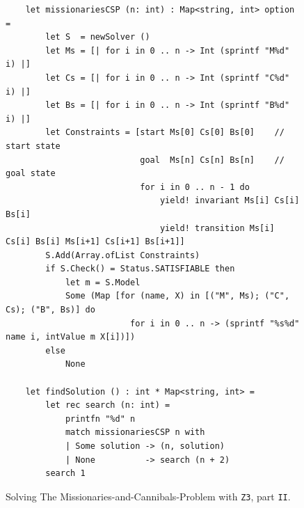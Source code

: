 \begin{figure}[!ht]
\centering
\begin{verbatim}
    let missionariesCSP (n: int) : Map<string, int> option =
        let S  = newSolver ()
        let Ms = [| for i in 0 .. n -> Int (sprintf "M%d" i) |]
        let Cs = [| for i in 0 .. n -> Int (sprintf "C%d" i) |]
        let Bs = [| for i in 0 .. n -> Int (sprintf "B%d" i) |]
        let Constraints = [start Ms[0] Cs[0] Bs[0]    // start state
                           goal  Ms[n] Cs[n] Bs[n]    // goal state
                           for i in 0 .. n - 1 do
                               yield! invariant Ms[i] Cs[i] Bs[i]
                               yield! transition Ms[i] Cs[i] Bs[i] Ms[i+1] Cs[i+1] Bs[i+1]]
        S.Add(Array.ofList Constraints)
        if S.Check() = Status.SATISFIABLE then
            let m = S.Model
            Some (Map [for (name, X) in [("M", Ms); ("C", Cs); ("B", Bs)] do
                         for i in 0 .. n -> (sprintf "%s%d" name i, intValue m X[i])])
        else
            None

    let findSolution () : int * Map<string, int> =
        let rec search (n: int) =
            printfn "%d" n
            match missionariesCSP n with
            | Some solution -> (n, solution)
            | None          -> search (n + 2)
        search 1
\end{verbatim}
\vspace*{-0.3cm}
\caption{Solving The Missionaries-and-Cannibals-Problem with \texttt{Z3}, part \texttt{II}.}
\label{fig:Missionaries-Z3.ipynb-2}
\end{figure}

